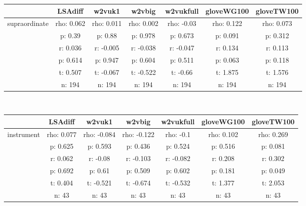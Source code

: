 \documentclass{article}
\begin{document}
\begin{tabular}{ccccccc|}\cline{2-7}
&\multicolumn{1}{|c}{LSAdiff} & w2vuk1 & w2vbig & w2vukfull & gloveWG100 & gloveTW100 \\\hline
\multicolumn{1}{|c|}{\multirow{6}{*}{supraordinate}} & rho: 0.062 & rho: 0.011 & rho: 0.002 & rho: -0.03 & rho: 0.122 & rho: 0.073 \\
\multicolumn{1}{|c|}{} & p: 0.39 & p: 0.88 & p: 0.978 & p: 0.673 & p: 0.091 & p: 0.312 \\
\multicolumn{1}{|c|}{} & r: 0.036 & r: -0.005 & r: -0.038 & r: -0.047 & r: 0.134 & r: 0.113 \\
\multicolumn{1}{|c|}{} & p: 0.614 & p: 0.947 & p: 0.604 & p: 0.511 & p: 0.063 & p: 0.118 \\
\multicolumn{1}{|c|}{} & t: 0.507 & t: -0.067 & t: -0.522 & t: -0.66 & t: 1.875 & t: 1.576 \\
\multicolumn{1}{|c|}{} & n: 194 & n: 194 & n: 194 & n: 194 & n: 194 & n: 194 \\
\hline
\end{tabular}\\
\begin{tabular}{ccccccc|}\cline{2-7}
&\multicolumn{1}{|c}{LSAdiff} & w2vuk1 & w2vbig & w2vukfull & gloveWG100 & gloveTW100 \\\hline
\multicolumn{1}{|c|}{\multirow{6}{*}{instrument}} & rho: 0.077 & rho: -0.084 & rho: -0.122 & rho: -0.1 & rho: 0.102 & rho: 0.269 \\
\multicolumn{1}{|c|}{} & p: 0.625 & p: 0.593 & p: 0.436 & p: 0.524 & p: 0.516 & p: 0.081 \\
\multicolumn{1}{|c|}{} & r: 0.062 & r: -0.08 & r: -0.103 & r: -0.082 & r: 0.208 & r: 0.302 \\
\multicolumn{1}{|c|}{} & p: 0.692 & p: 0.61 & p: 0.509 & p: 0.602 & p: 0.181 & p: 0.049 \\
\multicolumn{1}{|c|}{} & t: 0.404 & t: -0.521 & t: -0.674 & t: -0.532 & t: 1.377 & t: 2.053 \\
\multicolumn{1}{|c|}{} & n: 43 & n: 43 & n: 43 & n: 43 & n: 43 & n: 43 \\
\hline
\end{tabular}\\
\end{document}
